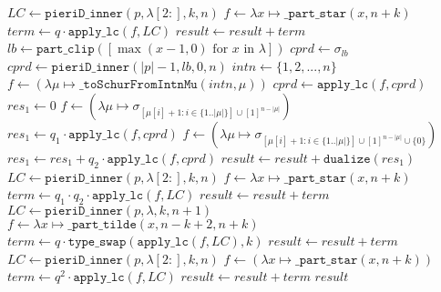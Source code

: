 \begin{algorithm}[H]
\begin{algorithmic}[1]
        \STATE $LC \gets \mathtt{pieriD\_inner}(p, \lambda[2:], k, n)$
        \STATE $f \gets \lambda x \mapsto \mathtt{\_part\_star}(x, n+k)$
        \STATE $term \gets q \cdot \mathtt{apply\_lc}(f, LC)$
        \STATE $result \gets result + term$
    \ENDIF
{}
        \STATE $lb \gets \mathtt{part\_clip}([\max(x-1, 0) \text{ for } x \text{ in } \lambda])$
        \STATE $cprd \gets \sigma_{lb}$
            \STATE $cprd \gets \mathtt{pieriD\_inner}(|p|-1, lb, 0, n)$
        \ENDIF
        \STATE $intn \gets \{1, 2, ..., n\}$
        \STATE $f \gets (\lambda \mu \mapsto \mathtt{\_toSchurFromIntnMu}(intn, \mu))$
        \STATE $cprd \gets \mathtt{apply\_lc}(f, cprd)$
        \STATE $res_1 \gets 0$
            \STATE $f \gets (\lambda \mu \mapsto \sigma_{[\mu[i]+1 : i \in \{1..|\mu|\}] \cup [1]^{n-|\mu|}})$
            \STATE $res_1 \gets q_1 \cdot \mathtt{apply\_lc}(f, cprd)$
        \ENDIF
            \STATE $f \gets (\lambda \mu \mapsto \sigma_{[\mu[i]+1 : i \in \{1..|\mu|\}] \cup [1]^{n-|\mu|} \cup \{0\}})$
            \STATE $res_1 \gets res_1 + q_2 \cdot \mathtt{apply\_lc}(f, cprd)$
        \ENDIF
        \STATE $result \gets result + \mathtt{dualize}(res_1)$
    \ENDIF
        \STATE $LC \gets \mathtt{pieriD\_inner}(p, \lambda[2:], k, n)$
        \STATE $f \gets \lambda x \mapsto \mathtt{\_part\_star}(x, n+k)$
        \STATE $term \gets q_1 \cdot q_2 \cdot \mathtt{apply\_lc}(f, LC)$
        \STATE $result \gets result + term$
    \ENDIF
\ELSE
        \STATE $LC \gets \mathtt{pieriD\_inner}(p, \lambda, k, n+1)$
        \STATE $f \gets \lambda x \mapsto \mathtt{\_part\_tilde}(x, n-k+2, n+k)$
        \STATE $term \gets q \cdot \mathtt{type\_swap}(\mathtt{apply\_lc}(f, LC), k)$
        \STATE $result \gets result + term$
    \ENDIF
        \STATE $LC \gets \mathtt{pieriD\_inner}(p, \lambda[2:], k, n)$
        \STATE $f \gets (\lambda x \mapsto \mathtt{\_part\_star}(x, n+k))$
        \STATE $term \gets q^2 \cdot \mathtt{apply\_lc}(f, LC)$
        \STATE $result \gets result + term$
    \ENDIF
\ENDIF
\RETURN $result$
\end{algorithmic}
\end{algorithm}

